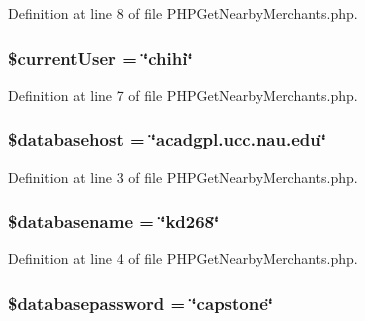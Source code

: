Definition at line 8 of file P\-H\-P\-Get\-Nearby\-Merchants.\-php.

\hypertarget{_p_h_p_get_nearby_merchants_8php_a478a2fc0252b087f8bc01921fef09b78}{
\subsubsection[{\$current\-User}]{\setlength{\rightskip}{0pt plus 5cm}\$current\-User = \char`\"{}chihi\char`\"{}}}\label{_p_h_p_get_nearby_merchants_8php_a478a2fc0252b087f8bc01921fef09b78}


Definition at line 7 of file P\-H\-P\-Get\-Nearby\-Merchants.\-php.

\hypertarget{_p_h_p_get_nearby_merchants_8php_a034ead57b6864a4413371711e8d65372}{
\subsubsection[{\$databasehost}]{\setlength{\rightskip}{0pt plus 5cm}\$databasehost = \char`\"{}acadgpl.\-ucc.\-nau.\-edu\char`\"{}}}\label{_p_h_p_get_nearby_merchants_8php_a034ead57b6864a4413371711e8d65372}


Definition at line 3 of file P\-H\-P\-Get\-Nearby\-Merchants.\-php.

\hypertarget{_p_h_p_get_nearby_merchants_8php_aace53f8afce81b52040cef0cd850138a}{
\subsubsection[{\$databasename}]{\setlength{\rightskip}{0pt plus 5cm}\$databasename = \char`\"{}kd268\char`\"{}}}\label{_p_h_p_get_nearby_merchants_8php_aace53f8afce81b52040cef0cd850138a}


Definition at line 4 of file P\-H\-P\-Get\-Nearby\-Merchants.\-php.

\hypertarget{_p_h_p_get_nearby_merchants_8php_a1a07536b6a5f43f2d8f826bd2ee6c91a}{
\subsubsection[{\$databasepassword}]{\setlength{\rightskip}{0pt plus 5cm}\$databasepassword = \char`\"{}capstone\char`\"{}}}\label{_p_h_p_get_nearby_merchants_8php_a1a07536b6a5f43f2d8f826bd2ee6c91a}


